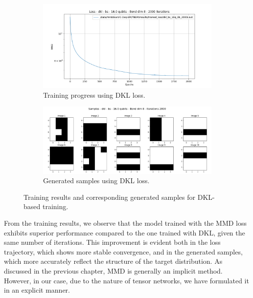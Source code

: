 \begin{figure}[h]
    \centering
    \begin{subfigure}[b]{\textwidth}  
        \centering
        \includegraphics[width=\textwidth]{images/loss_plot/loss_dkl_bs_16.0q_8b_2000i.png}
        \caption{Training progress using DKL loss.}
    \end{subfigure}
    \hfill
    \begin{subfigure}[b]{\textwidth}  
        \centering
        \includegraphics[width=\textwidth]{images/sample_plot/samples_dkl_bs_16.0q_8b_2000i.png}
        \caption{Generated samples using DKL loss.}
    \end{subfigure}
    \caption{Training results and corresponding generated samples for DKL-based training.}
    \label{fig:training_dkl}
\end{figure}
From the training results, we observe that the model trained with the MMD loss exhibits superior performance compared to the one trained with DKL, given the same number of iterations. This improvement is evident both in the loss trajectory, which shows more stable convergence, and in the generated samples, which more accurately reflect the structure of the target distribution. As discussed in the previous chapter, MMD is generally an implicit method. However, in our case, due to the nature of tensor networks, we have formulated it in an explicit manner. 

